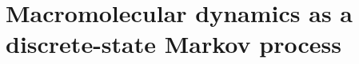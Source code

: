 \chapter{Macromolecular dynamics as a discrete-state Markov process}
\label{chapter:derivation-of-master-equation} 
